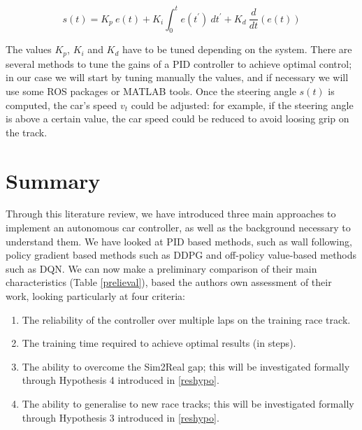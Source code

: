 \begin{equation}
	\label{pid}
	s(t) = K_p \: e(t) + K_i \int_0^{t} e(t^{'}) \: dt^{'} + K_d \: \frac{d}{dt}(e(t))
\end{equation}

The values $K_p$, $K_i$ and $K_d$ have to be tuned depending on the system. There are several methods to tune the gains of a PID controller to achieve optimal control; in our case we will start by tuning manually the values, and if necessary we will use some ROS packages or MATLAB tools.\newline
Once the steering angle $s(t)$ is computed, the car's speed $v_{t}$ could be adjusted: for example, if the steering angle is above a certain value, the car speed could be reduced to avoid loosing grip on the track.

\section{Summary}
Through this literature review, we have introduced three main approaches to implement an autonomous car controller, as well as the background necessary to understand them. We have looked at PID based methods, such as wall following, policy gradient based methods such as DDPG and off-policy value-based methods such as DQN. \newline
We can now make a preliminary comparison of their main characteristics (Table \ref{prelieval}), based the authors own assessment of their work, looking particularly at four criteria:
\begin{enumerate}
	\item The reliability of the controller over multiple laps on the training race track.
	\item The training time required to achieve optimal results (in steps).
	\item The ability to overcome the Sim2Real gap; this will be investigated formally through Hypothesis 4 introduced in \ref{reshypo}.
	\item The ability to generalise to new race tracks; this will be investigated formally through Hypothesis 3 introduced in \ref{reshypo}.
\end{enumerate}


